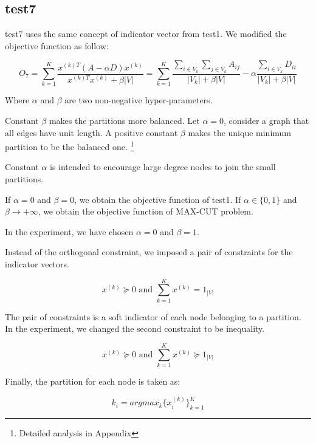 \subsection{test7}

test7 uses the same concept of indicator vector from test1. We modified the objective function as follow:

\[
O_7 = \sum_{k=1}^{K} \frac{x^{(k)T} (A - \alpha D) x^{(k)}}{x^{(k)T} x^{(k)} + \beta |V|}
=
\sum_{k=1}^{K} \frac{\sum_{i \in V_k} \sum_{j \in V_k} A_{ij}}{|V_k| + \beta |V|} - \alpha \frac{\sum_{i \in V_k} D_{ii}}{|V_k| + \beta |V|}
\]

Where $\alpha$ and $\beta$ are two non-negative hyper-parameters.

Constant $\beta$ makes the partitions more balanced. Let $\alpha = 0$, consider a graph that all edges have unit length. A positive constant $\beta$ makes the unique minimum partition to be the balanced one. \footnote{Detailed analysis in Appendix}

Constant $\alpha$ is intended to encourage large degree nodes to join the small partitions.

If $\alpha = 0$ and $\beta = 0$, we obtain the objective function of test1. If $\alpha \in \{0, 1\}$ and $\beta \to +\infty$, we obtain the objective function of MAX-CUT problem.

In the experiment, we have chosen $\alpha = 0$ and $\beta = 1$.

Instead of the orthogonal constraint, we imposed a pair of constraints for the indicator vectors.

\[
x^{(k)} \succeq 0 \text{ and } \sum_{k=1}^{K} x^{(k)} = 1_{|V|}
\]

The pair of constraints is a soft indicator of each node belonging to a partition. In the experiment, we changed the second constraint to be inequality.

\[
x^{(k)} \succeq 0 \text{ and } \sum_{k=1}^{K} x^{(k)} \succeq 1_{|V|}
\]

Finally, the partition for each node is taken as:

\[
k_i = argmax_k \{x^{(k)}_i\}_{k=1}^{K} 
\]

